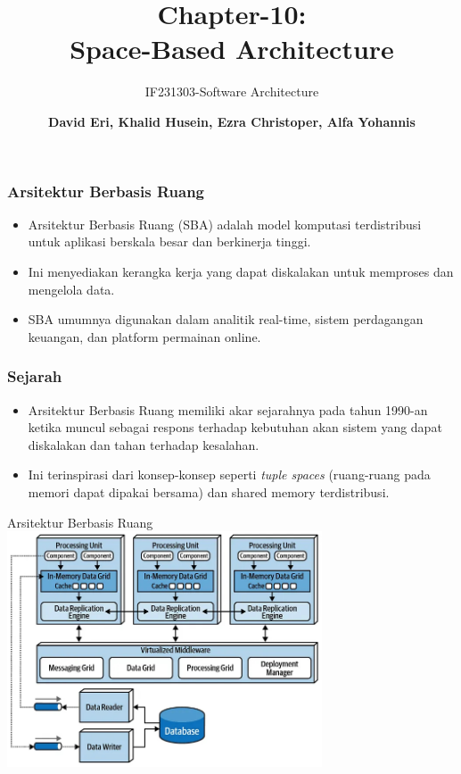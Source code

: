 \documentclass[aspectratio=169, table]{beamer}
\subtitle{IF231303-Software Architecture}
\title{\huge Chapter-10:\\Space-Based Architecture}
\author[Pradita]{\small {\textbf{David Eri, Khalid Husein, Ezra Christoper, Alfa Yohannis}}}
\begin{document}
    \frame{\titlepage}

    \begin{frame}
        \frametitle{Arsitektur Berbasis Ruang}
        \begin{itemize}
            \item Arsitektur Berbasis Ruang (SBA) adalah model komputasi terdistribusi untuk aplikasi berskala besar dan berkinerja tinggi.
            \item Ini menyediakan kerangka kerja yang dapat diskalakan untuk memproses dan mengelola data.
            \item SBA umumnya digunakan dalam analitik real-time, sistem perdagangan keuangan, dan platform permainan online.
        \end{itemize}
    \end{frame}

    \begin{frame}
        \frametitle{Sejarah}
        \begin{itemize}
            \item Arsitektur Berbasis Ruang memiliki akar sejarahnya pada tahun 1990-an ketika muncul sebagai respons terhadap kebutuhan akan sistem yang dapat diskalakan dan tahan terhadap kesalahan.
            \item Ini terinspirasi dari konsep-konsep seperti \textit{tuple spaces} (ruang-ruang pada memori dapat dipakai bersama) dan shared memory terdistribusi.
        \end{itemize}
    \end{frame}

    \begin{frame}{Arsitektur Berbasis Ruang}
        \vspace{30pt}
        \centering
        \includegraphics[width=0.7\textwidth]{../../images/spaced-based_architecture}
    \end{frame}
\end{document}
